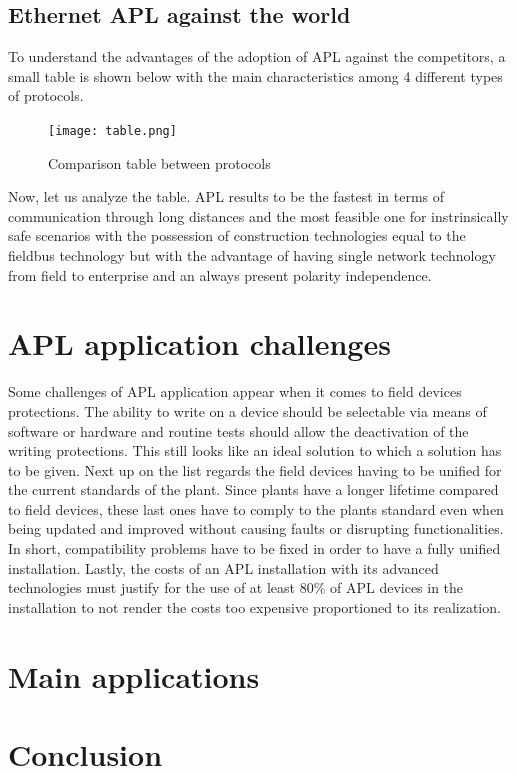 \documentclass[conference]{IEEEtran}
\begin{document}
\subsection{Ethernet APL against the world}
To understand the advantages of the adoption of APL against the competitors, a small table is shown below with the main characteristics among 4 different types of protocols.
\begin{figure}[htbp]
    \centerline{\texttt{[image: table.png]}}
    \caption{Comparison table between protocols \cite{b8}}
    \label{table}
\end{figure}
Now, let us analyze the table. APL results to be the fastest in terms of communication through long distances and the most feasible one for instrinsically safe scenarios with the possession of construction technologies equal to the fieldbus technology but with the advantage of having single network technology from field to enterprise and an always present polarity independence.
\section{APL application challenges}
Some challenges of APL application appear when it comes to field devices protections. The ability to write on a device should be selectable via means of software or hardware and routine tests should allow the deactivation of the writing protections. This still looks like an ideal solution to which a solution has to be given. Next up on the list regards the field devices having to be unified for the current standards of the plant. Since plants have a longer lifetime compared to field devices, these last ones have to comply to the plants standard even when being updated and improved without causing faults or disrupting functionalities. In short, compatibility problems have to be fixed in order to have a fully unified installation. Lastly, the costs of an APL installation with its advanced technologies must justify for the use of at least 80\% of APL devices in the installation to not render the costs too expensive proportioned to its realization.\cite{b10}
\section{Main applications}
\section{Conclusion}
\end{document}
